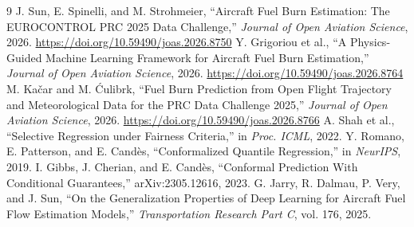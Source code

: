 \documentclass[11pt]{article}
\begin{document}
\begin{thebibliography}{9}
 J. Sun, E. Spinelli, and M. Strohmeier, ``Aircraft Fuel Burn Estimation: The EUROCONTROL PRC 2025 Data Challenge,'' \emph{Journal of Open Aviation Science}, 2026. \url{https://doi.org/10.59490/joas.2026.8750}
 Y. Grigoriou et al., ``A Physics-Guided Machine Learning Framework for Aircraft Fuel Burn Estimation,'' \emph{Journal of Open Aviation Science}, 2026. \url{https://doi.org/10.59490/joas.2026.8764}
 M. Ka\v{c}ar and M. \'{C}ulibrk, ``Fuel Burn Prediction from Open Flight Trajectory and Meteorological Data for the PRC Data Challenge 2025,'' \emph{Journal of Open Aviation Science}, 2026. \url{https://doi.org/10.59490/joas.2026.8766}
 A. Shah et al., ``Selective Regression under Fairness Criteria,'' in \emph{Proc. ICML}, 2022.
 Y. Romano, E. Patterson, and E. Cand\`es, ``Conformalized Quantile Regression,'' in \emph{NeurIPS}, 2019.
 I. Gibbs, J. Cherian, and E. Cand\`es, ``Conformal Prediction With Conditional Guarantees,'' arXiv:2305.12616, 2023.
 G. Jarry, R. Dalmau, P. Very, and J. Sun, ``On the Generalization Properties of Deep Learning for Aircraft Fuel Flow Estimation Models,'' \emph{Transportation Research Part C}, vol. 176, 2025.
\end{thebibliography}
\end{document}
